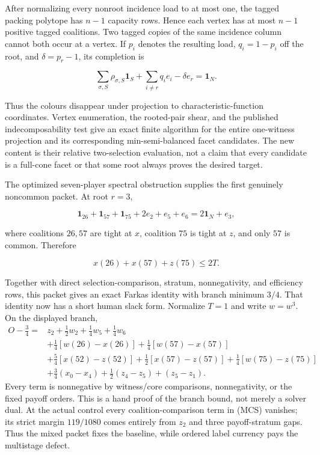 \documentclass[11pt]{article}
\newcommand{\one}{\mathbf 1}
\begin{document}
After normalizing every nonroot incidence load to at most one, the tagged
packing polytope has $n-1$ capacity rows.  Hence each vertex has at most
$n-1$ positive tagged coalitions.  Two tagged copies of the same incidence
column cannot both occur at a vertex.  If $p_i$ denotes the resulting load,
$q_i=1-p_i$ off the root, and $\delta=p_r-1$, its completion is

\[
 \sum_{\sigma,S}\rho_{\sigma,S}\one_S
 +\sum_{i\ne r}q_i e_i-\delta e_r=\one_N.            \tag{MCC}
\]

Thus the colours disappear under projection to characteristic-function
coordinates.  Vertex enumeration, the rooted-pair shear, and the published
indecomposability test give an exact finite algorithm for the entire
one-witness projection and its corresponding min-semi-balanced facet
candidates.  The new content is their relative two-selection evaluation, not
a claim that every candidate is a full-cone facet or that some root always
proves the desired target.

The optimized seven-player spectral obstruction supplies the first genuinely
noncommon packet.  At root $r=3$,

\[
 \one_{26}+\one_{57}+\one_{75}+2e_2+e_5+e_6
   =2\one_N+e_3,                                    \tag{MC7}
\]

where coalitions $26,57$ are tight at $x$, coalition $75$ is tight at $z$,
and only $57$ is common.  Therefore

\[
 x(26)+x(57)+z(75)\le2T.                            \tag{MC8}
\]

Together with direct selection-comparison, stratum, nonnegativity, and
efficiency rows, this packet gives an exact Farkas identity with branch
minimum $3/4$.  That identity now has a short human slack form.  Normalize
$T=1$ and write $w=w^3$.  On the displayed branch,
\begin{align*}
 O-\frac34={}&z_2+\frac12w_2+\frac14w_5+\frac14w_6\\
 &+\frac14[w(26)-x(26)]+\frac14[w(57)-x(57)]\\
 &+\frac54[x(52)-z(52)]+\frac12[x(57)-z(57)]
   +\frac14[w(75)-z(75)]\\
 &+\frac34(x_0-x_4)+\frac12(z_4-z_5)+(z_5-z_1).       \tag{MCS}
\end{align*}
Every term is nonnegative by witness/core comparisons, nonnegativity, or the
fixed payoff orders.  This is a hand proof of the branch bound, not merely a
solver dual.  At the actual control every coalition-comparison term in (MCS)
vanishes; its strict margin $119/1080$ comes entirely from $z_2$ and three
payoff-stratum gaps.  Thus the mixed packet fixes the baseline, while ordered
label currency pays the multistage defect.
\end{document}
